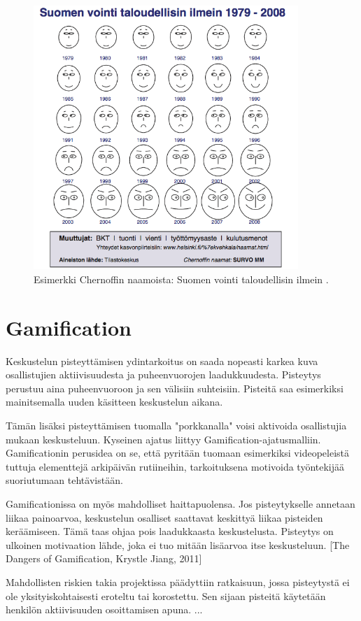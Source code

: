 \documentclass[11pt,a4paper,oneside]{memoir}
\begin{document}
\begin{figure}[h]
    \centering
    \includegraphics[width=10cm]{suomen-vointi-chernoff}
    \caption{Esimerkki Chernoffin naamoista: Suomen vointi taloudellisin ilmein \cite{wikibooks:latex}.}
    \label{fig:suomen-voint-chernoff}
\end{figure}

\section{Gamification}
Keskustelun pisteyttämisen ydintarkoitus on saada nopeasti karkea kuva osallistujien aktiivisuudesta ja puheenvuorojen laadukkuudesta. Pisteytys perustuu aina puheenvuoroon ja sen välisiin suhteisiin. Pisteitä saa esimerkiksi mainitsemalla uuden käsitteen keskustelun aikana.

Tämän lisäksi pisteyttämisen tuomalla "porkkanalla" voisi aktivoida osallistujia mukaan keskusteluun. Kyseinen ajatus liittyy Gamification-ajatusmalliin. Gamificationin perusidea on se, että pyritään tuomaan esimerkiksi videopeleistä tuttuja elementtejä arkipäivän rutiineihin, tarkoituksena motivoida työntekijää suoriutumaan tehtävistään.

Gamificationissa on myös mahdolliset haittapuolensa. Jos pisteytykselle annetaan liikaa painoarvoa, keskustelun osalliset saattavat keskittyä liikaa pisteiden keräämiseen. Tämä taas ohjaa pois laadukkaasta keskustelusta. Pisteytys on ulkoinen motivaation lähde, joka ei tuo mitään lisäarvoa itse keskusteluun. [The Dangers of Gamification, Krystle Jiang, 2011]

Mahdollisten riskien takia projektissa päädyttiin ratkaisuun, jossa pisteytystä ei ole yksityiskohtaisesti eroteltu tai korostettu. Sen sijaan pisteitä käytetään henkilön aktiivisuuden osoittamisen apuna.
...
\end{document}
